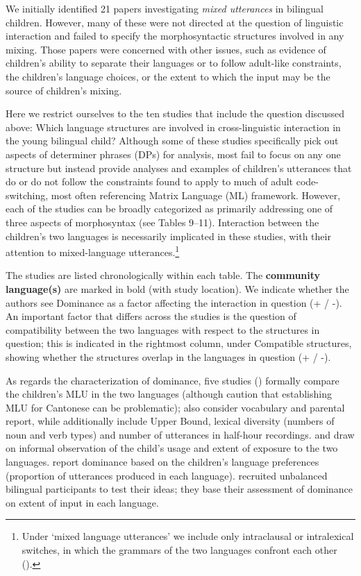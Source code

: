 \documentclass[output=paper]{langscibook}
\begin{document}
We initially identified 21 papers investigating \textit{mixed utterances} in bilingual children. However, many of these were not directed at the question of linguistic interaction and failed to specify the morphosyntactic structures involved in any mixing. Those papers were concerned with other issues, such as evidence of children’s ability to separate their languages or to follow adult-like constraints, the children’s language choices, or the extent to which the input may be the source of children’s mixing. 

Here we restrict ourselves to the ten studies that include the question discussed above: Which language structures are involved in cross-linguistic interaction in the young bilingual child? Although some of these studies specifically pick out aspects of determiner phrases (DPs) for analysis, most fail to focus on any one structure but instead provide analyses and examples of children’s utterances that do or do not follow the constraints found to apply to much of adult code-switching, most often referencing  Matrix Language (ML) framework. However, each of the studies can be broadly categorized as primarily addressing one of three aspects of morphosyntax (see Tables 9–11). Interaction between the children’s two languages is necessarily implicated in these studies, with their attention to mixed-language utterances.\footnote{Under ‘mixed language utterances’ we include only intraclausal or intralexical switches, in which the grammars of the two languages confront each other (\citealt{Myers-Scotton1993duelling}).}

The studies are listed chronologically within each table. The \textbf{community} \textbf{language(s)} are marked in bold (with study location). We indicate whether the authors see Dominance as a factor affecting the interaction in question (+ / -). An important factor that differs across the studies is the question of compatibility between the two languages with respect to the structures in question; this is indicated in the rightmost column, under Compatible structures, showing whether the structures overlap in the languages in question (+ / -).

As regards the characterization of dominance, five studies (\citealt{CantoneMüller2008,EichlerEtAl2012,GaskinsEtAl2021,ParadisEtAl2000,YipMatthews2016}) formally compare the children’s MLU in the two languages (although \citealt{YipMatthews2000} caution that establishing MLU for Cantonese can be problematic); \citeauthor{ParadisEtAl2000} also consider vocabulary and parental report, while \citeauthor{CantoneMüller2008} additionally include Upper Bound, lexical diversity (numbers of noun and verb types) and number of utterances in half-hour recordings. \citet{Soriente2014} and \citet{Vihman2016,Vihman2018} draw on informal observation of the child’s usage and extent of exposure to the two languages. \citet{Gawlitzek-MaiwaldTracy1996} report dominance based on the children’s language preferences (proportion of utterances produced in each language). \citet{BernardiniSchlyter2004} recruited unbalanced bilingual participants to test their ideas; they base their assessment of dominance on extent of input in each language.
\end{document}
